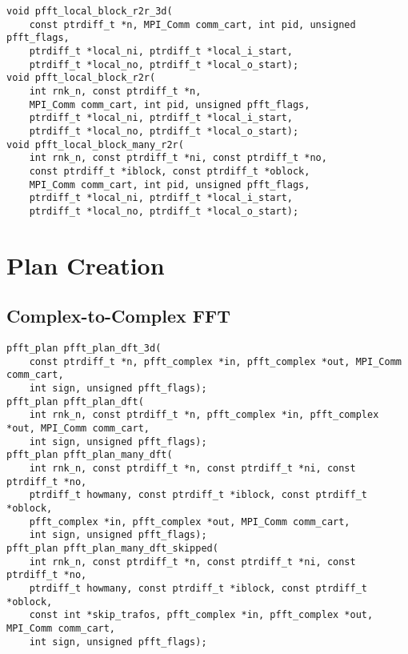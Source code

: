 \begin{lstlisting}
void pfft_local_block_r2r_3d(
    const ptrdiff_t *n, MPI_Comm comm_cart, int pid, unsigned pfft_flags,
    ptrdiff_t *local_ni, ptrdiff_t *local_i_start,
    ptrdiff_t *local_no, ptrdiff_t *local_o_start);
void pfft_local_block_r2r(
    int rnk_n, const ptrdiff_t *n,
    MPI_Comm comm_cart, int pid, unsigned pfft_flags,
    ptrdiff_t *local_ni, ptrdiff_t *local_i_start,
    ptrdiff_t *local_no, ptrdiff_t *local_o_start);
void pfft_local_block_many_r2r(
    int rnk_n, const ptrdiff_t *ni, const ptrdiff_t *no,
    const ptrdiff_t *iblock, const ptrdiff_t *oblock,
    MPI_Comm comm_cart, int pid, unsigned pfft_flags,
    ptrdiff_t *local_ni, ptrdiff_t *local_i_start,
    ptrdiff_t *local_no, ptrdiff_t *local_o_start);
\end{lstlisting}


\section{Plan Creation}

\subsection{Complex-to-Complex FFT}
\begin{lstlisting}
pfft_plan pfft_plan_dft_3d(
    const ptrdiff_t *n, pfft_complex *in, pfft_complex *out, MPI_Comm comm_cart,
    int sign, unsigned pfft_flags);
pfft_plan pfft_plan_dft(
    int rnk_n, const ptrdiff_t *n, pfft_complex *in, pfft_complex *out, MPI_Comm comm_cart,
    int sign, unsigned pfft_flags);
pfft_plan pfft_plan_many_dft(
    int rnk_n, const ptrdiff_t *n, const ptrdiff_t *ni, const ptrdiff_t *no,
    ptrdiff_t howmany, const ptrdiff_t *iblock, const ptrdiff_t *oblock,
    pfft_complex *in, pfft_complex *out, MPI_Comm comm_cart,
    int sign, unsigned pfft_flags);
pfft_plan pfft_plan_many_dft_skipped(
    int rnk_n, const ptrdiff_t *n, const ptrdiff_t *ni, const ptrdiff_t *no,
    ptrdiff_t howmany, const ptrdiff_t *iblock, const ptrdiff_t *oblock,
    const int *skip_trafos, pfft_complex *in, pfft_complex *out, MPI_Comm comm_cart,
    int sign, unsigned pfft_flags);
\end{lstlisting}

